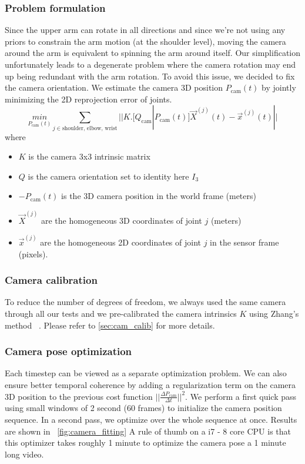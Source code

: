 \subsubsection{Problem formulation}
Since the upper arm can rotate in all directions and since we're not using any priors to constrain the arm motion (at the shoulder level),
moving the camera around the arm is equivalent to spinning the arm around itself. 
Our simplification unfortunately leads to a degenerate problem where the camera rotation may end up being redundant with the arm rotation.
To avoid this issue, we decided to fix the camera orientation. 
We estimate the camera 3D position $P_{\text{cam}}(t)$ 
by jointly minimizing the 2D reprojection error of joints.
$$\underset{P_{\text{cam}}(t)}{min}\sum_{j\in{\text{shoulder, elbow, wrist}}} ||K.\big[Q_{\text{cam}} | P_{\text{cam}}(t)] \vec{X}^{(j)}(t) - \vec{x}^{(j)}(t) ||$$
where
\begin{itemize}
    \item $K$ is the camera 3x3 intrinsic matrix
    \item $Q$ is the camera orientation set to identity here $I_{3}$
    \item $-P_{\text{cam}}(t)$ is the 3D camera position in the world frame (meters)
    \item $\vec{X}^{(j)}$ are the homogeneous 3D coordinates of joint $j$ (meters)
    \item $\vec{x}^{(j)}$ are the homogeneous 2D coordinates of joint $j$ in the sensor frame (pixels).
\end{itemize}

\subsubsection{Camera calibration}
To reduce the number of degrees of freedom, we always used the same camera through all our tests and 
we pre-calibrated the camera intrinsics $K$ using Zhang's method ~\cite{Zhang00calib}.
Please refer to \ref{sec:cam_calib} for more details.

\subsubsection{Camera pose optimization}
Each timestep can be viewed as a separate optimization problem. We can also ensure better temporal coherence
by adding a regularization term on the camera 3D position to the previous cost function $||\frac{\Delta P_{\text{cam}}}{\Delta{t}}||^2$.
We perform a first quick pass using small windows of 2 second (60 frames) to initialize the camera position sequence.
In a second pass, we optimize over the whole sequence at once.
Results are shown in ~\cref{fig:camera_fitting}
A rule of thumb on a i7 - 8 core CPU is that this optimizer takes roughly 1 minute to optimize the camera pose a 1 minute long video.

